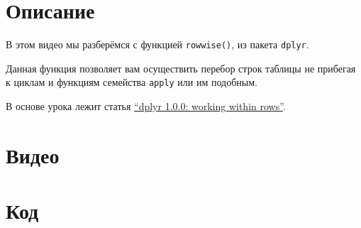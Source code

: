 \documentclass[
]{book}
\begin{document}
\hypertarget{ux43eux43fux438ux441ux430ux43dux438ux435-2}{%
\section{Описание}\label{ux43eux43fux438ux441ux430ux43dux438ux435-2}}

В этом видео мы разберёмся с функцией \texttt{rowwise()}, из пакета \texttt{dplyr}.

Данная функция позволяет вам осуществить перебор строк таблицы не прибегая к циклам и функциям семейства \texttt{apply} или им подобным.

В основе урока лежит статья \href{https://www.tidyverse.org/blog/2020/04/dplyr-1-0-0-rowwise/}{``dplyr 1.0.0: working within rows''}.

\hypertarget{ux432ux438ux434ux435ux43e-2}{%
\section{Видео}\label{ux432ux438ux434ux435ux43e-2}}

\hypertarget{ux43aux43eux434-2}{%
\section{Код}\label{ux43aux43eux434-2}}
\end{document}
